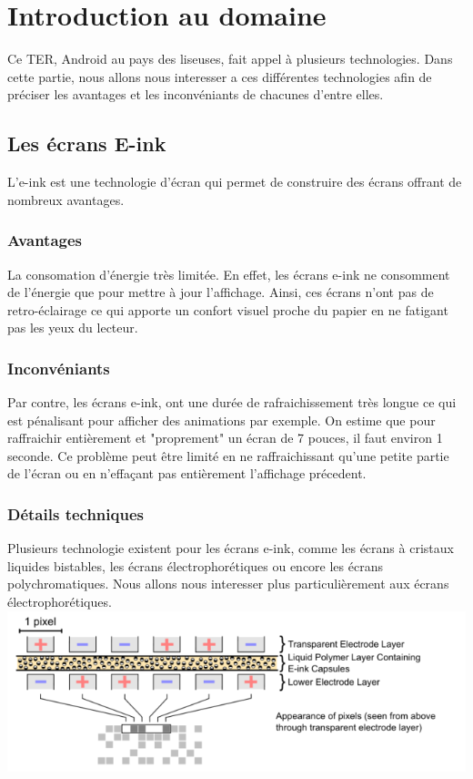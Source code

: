 \chapter{Introduction au domaine}
Ce TER, Android au pays des liseuses, fait appel à plusieurs technologies. Dans cette partie, nous allons nous interesser a ces différentes technologies afin de préciser les avantages et les inconvéniants de chacunes d'entre elles.
\section{Les écrans E-ink}
L'e-ink est une technologie d'écran qui permet de construire des écrans offrant de nombreux avantages.
\subsection{Avantages}
La consomation d'énergie très limitée. En effet, les écrans e-ink ne consomment de l'énergie que pour mettre à jour l'affichage. Ainsi, ces écrans n'ont pas de retro-éclairage ce qui apporte un confort visuel proche du papier en ne fatigant pas les yeux du lecteur. 
\subsection{Inconvéniants}
Par contre, les écrans e-ink, ont une durée de rafraichissement très longue ce qui est pénalisant pour afficher des animations par exemple. On estime que pour raffraichir entièrement et "proprement" un écran de 7 pouces, il faut environ 1 seconde. Ce problème peut être limité en ne raffraichissant qu'une petite partie de l'écran ou en n'effaçant pas entièrement l'affichage précedent. 
\subsection{Détails techniques}
Plusieurs technologie existent pour les écrans e-ink, comme les écrans à cristaux liquides bistables, les écrans électrophorétiques ou encore les écrans polychromatiques. Nous allons nous interesser plus particulièrement aux écrans électrophorétiques.\\
\includegraphics{Electrophoretic.png}
